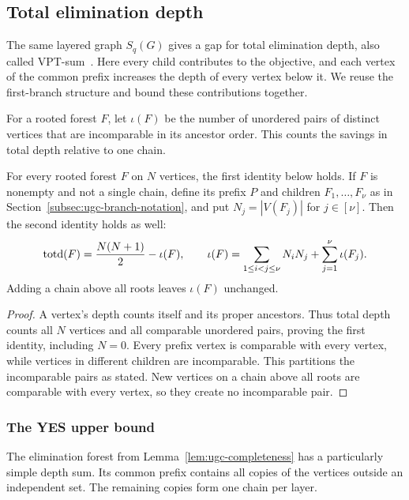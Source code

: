 \subsection{Total elimination depth}
\label{sec:total-depth}

The same layered graph $S_q(G)$ gives a gap for total elimination
depth, also called VPT-sum~\cite{HogemoEtAl2021}. Here every child
contributes to the objective, and each vertex of the common prefix
increases the depth of every vertex below it. We reuse the
first-branch structure and bound these contributions together.

For a rooted forest $F$, let $\iota(F)$ be the number of unordered
pairs of distinct vertices that are incomparable in its ancestor order.
This counts the savings in total depth relative to one chain.

\begin{lemma}
\label{lem:incomparable-pair-accounting}
For every rooted forest $F$ on $N$ vertices, the first identity below
holds. If $F$ is nonempty and not a single chain, define its prefix
$P$ and children $F_1,\ldots,F_\nu$ as in
Section~\ref{subsec:ugc-branch-notation}, and put $N_j=|V(F_j)|$
for $j\in[\nu]$. Then the second identity holds as well:
\[
 \operatorname{totd}(F)=\frac{N(N+1)}2-\iota(F),\qquad \iota(F)=\sum_{1\leq i<j\leq\nu}N_iN_j+
           \sum_{j=1}^{\nu}\iota(F_j).
\]
Adding a chain above all roots leaves $\iota(F)$ unchanged.
\end{lemma}

\begin{proof}
A vertex's depth counts itself and its proper ancestors. Thus total
depth counts all $N$ vertices and all comparable unordered pairs,
proving the first identity, including $N=0$. Every prefix vertex
is comparable with every vertex, while vertices in different children
are incomparable. This partitions the incomparable pairs as stated.
New vertices on a chain above all roots are comparable with every
vertex, so they create no incomparable pair.
\end{proof}

\subsubsection{The YES upper bound}

The elimination forest from Lemma~\ref{lem:ugc-completeness} has a
particularly simple depth sum. Its common prefix contains all copies
of the vertices outside an independent set. The remaining copies form
one chain per layer.

